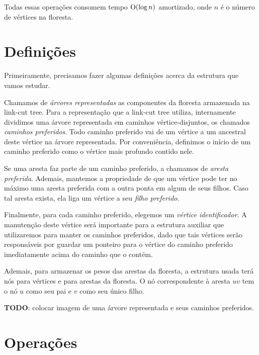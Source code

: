 Todas essas operações consomem tempo $\mathrm{O}(\log n)$ amortizado, onde $n$ é o número de vértices na floresta.

\section{Definições}
\label{sec:lct-definicoes}

Primeiramente, precisamos fazer algumas definições acerca da estrutura que vamos estudar.

Chamamos de \emph{árvores representadas} as componentes da floresta armazenada na link-cut tree. Para a representação que a link-cut tree utiliza, internamente dividimos uma árvore representada em caminhos vértice-disjuntos, os chamados \emph{caminhos preferidos}. Todo caminho preferido vai de um vértice a um ancestral deste vértice na árvore representada. Por conveniência, definimos o início de um caminho preferido como o vértice mais profundo contido nele.

Se uma aresta faz parte de um caminho preferido, a chamamos de \emph{aresta preferida}. Ademais, mantemos a propriedade de que um vértice pode ter no máximo uma aresta preferida com a outra ponta em algum de seus filhos. Caso tal aresta exista, ela liga um vértice a seu \emph{filho preferido}.

Finalmente, para cada caminho preferido, elegemos um \emph{vértice identificador}. A manutenção deste vértice será importante para a estrutura auxiliar que utilizaremos para manter os caminhos preferidos, dado que tais vértices serão responsáveis por guardar um ponteiro para o vértice do caminho preferido imediatamente acima do caminho que o contém.

Ademais, para armazenar os pesos das arestas da floresta, a estrutura usada terá nós para vértices e para arestas da floresta. O nó correspondente à aresta $uv$ tem o nó $u$ como seu pai e $v$ como seu único filho.

\begin{center}
    \textbf{TODO}: colocar imagem de uma árvore representada e seus caminhos preferidos.
\end{center}

\section{Operações}
\label{sec:lct-operacoes}

